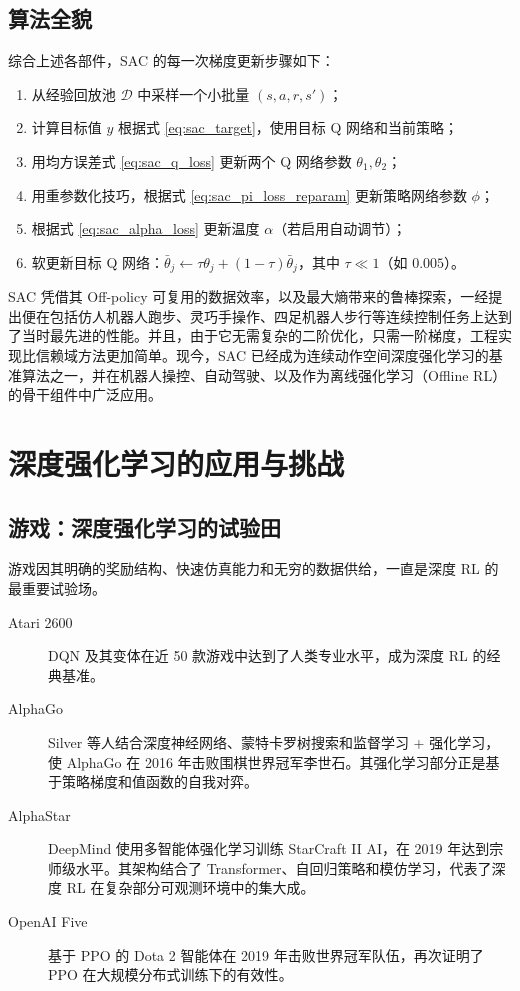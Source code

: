 \subsection{算法全貌}

综合上述各部件，SAC 的每一次梯度更新步骤如下：

\begin{enumerate}
\item 从经验回放池 $\mathcal{D}$ 中采样一个小批量 $(s, a, r, s')$；
\item 计算目标值 $y$ 根据式 \eqref{eq:sac_target}，使用目标 Q 网络和当前策略；
\item 用均方误差式 \eqref{eq:sac_q_loss} 更新两个 Q 网络参数 $\theta_1, \theta_2$；
\item 用重参数化技巧，根据式 \eqref{eq:sac_pi_loss_reparam} 更新策略网络参数 $\phi$；
\item 根据式 \eqref{eq:sac_alpha_loss} 更新温度 $\alpha$（若启用自动调节）；
\item 软更新目标 Q 网络：$\bar\theta_j \leftarrow \tau \theta_j + (1-\tau) \bar\theta_j$，其中 $\tau \ll 1$（如 $0.005$）。
\end{enumerate}

SAC 凭借其 Off-policy 可复用的数据效率，以及最大熵带来的鲁棒探索，一经提出便在包括仿人机器人跑步、灵巧手操作、四足机器人步行等连续控制任务上达到了当时最先进的性能。并且，由于它无需复杂的二阶优化，只需一阶梯度，工程实现比信赖域方法更加简单。现今，SAC 已经成为连续动作空间深度强化学习的基准算法之一，并在机器人操控、自动驾驶、以及作为离线强化学习（Offline RL）的骨干组件中广泛应用。

\section{深度强化学习的应用与挑战}

\subsection{游戏：深度强化学习的试验田}

游戏因其明确的奖励结构、快速仿真能力和无穷的数据供给，一直是深度 RL 的最重要试验场。

\begin{description}
\item[Atari 2600] DQN 及其变体在近 50 款游戏中达到了人类专业水平，成为深度 RL 的经典基准\cite{Volodymyr2015Human}。
\item[AlphaGo] Silver 等人结合深度神经网络、蒙特卡罗树搜索和监督学习 + 强化学习，使 AlphaGo 在 2016 年击败围棋世界冠军李世石\cite{0Mastering}。其强化学习部分正是基于策略梯度和值函数的自我对弈。
\item[AlphaStar] DeepMind 使用多智能体强化学习训练 StarCraft II AI，在 2019 年达到宗师级水平\cite{2020Grandmaster}。其架构结合了 Transformer、自回归策略和模仿学习，代表了深度 RL 在复杂部分可观测环境中的集大成。
\item[OpenAI Five] 基于 PPO 的 Dota 2 智能体在 2019 年击败世界冠军队伍，再次证明了 PPO 在大规模分布式训练下的有效性\cite{openai2019dota2largescale}。
\end{description}

